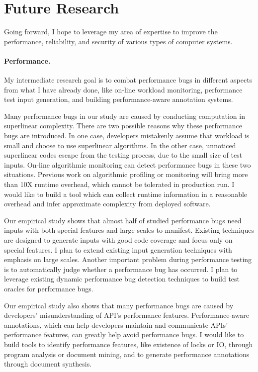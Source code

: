 \documentclass[10pt]{article}
\begin{document}
\vspace{-.1in}
\section{Future Research}

Going forward, I hope to leverage my area of expertise to improve the performance, 
reliability, and security of various types of computer systems. 

\vspace{-.1in}
\paragraph{Performance.} My intermediate research goal is to combat performance bugs 
in different aspects from what I have already done, 
like on-line workload monitoring, performance test input generation, 
and building performance-aware annotation systems. 


Many performance bugs in our study are caused by conducting computation in superlinear complexity. 
There are two possible reasons why these performance bugs are introduced. 
In one case, developers mistakenly assume that workload is small and choose to use superlinear algorithms. 
In the other case, unnoticed superlinear codes escape from the testing process, due to the small size of test inputs. 
On-line algorithmic monitoring can detect performance bugs in these two situations. 
Previous work on algorithmic profiling or monitoring will bring more than 10X runtime overhead, 
which cannot be tolerated in production run.
I would like to build a tool which can collect runtime information in a reasonable overhead 
and infer approximate complexity from deployed software. 


Our empirical study shows that almost half of studied performance bugs need inputs with both special features and large scales to manifest. 
Existing techniques are designed to generate inputs with good code coverage and focus only on special features.
I plan to extend existing input generation techniques with emphasis on large scales. 
Another important problem during performance testing is to automatically judge whether a performance bug has occurred. 
I plan to leverage existing dynamic performance bug detection techniques to build test oracles for performance bugs.

Our empirical study also shows that many performance bugs are caused by developers' misunderstanding of API's performance features. 
Performance-aware annotations, which can help developers maintain and communicate APIs' performance features, 
can greatly help avoid performance bugs. 
I would like to build tools to identify performance features, like existence of locks or IO, 
through program analysis or document mining, 
and to generate performance annotations through document synthesis. 
\end{document}
